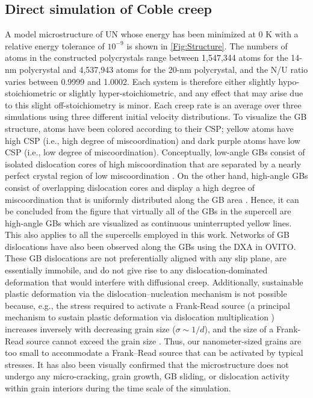 \documentclass[preprint,12pt,sort&compress]{elsarticle} %
\newcommand{\?}{\stackrel{?}{=}}
\begin{document}
\subsection{Direct simulation of Coble creep}
\label{Sec:CreepResults}

A model microstructure of UN whose energy has been minimized at 0 K with a relative energy tolerance of $10^{-9}$ is shown in \cref{Fig:Structure}. The numbers of atoms in the constructed polycrystals range between 1,547,344 atoms for the 14-nm polycrystal and 4,537,943 atoms for the 20-nm polycrystal, and the N/U ratio varies between 0.9999 and 1.0002. Each system is therefore either slightly hypo-stoichiometric or slightly hyper-stoichiometric, and any effect that may arise due to this slight off-stoichiometry is minor. Each creep rate is an average over three simulations using three different initial velocity distributions. To visualize the GB structure, atoms have been colored according to their CSP; yellow atoms have high CSP (i.e., high degree of miscoordination) and dark purple atoms have low CSP (i.e., low degree of miscoordination). Conceptually, low-angle GBs consist of isolated dislocation cores of high miscoordination that are separated by a nearly perfect crystal region of low miscoordination \cite{Keblinski1999}. On the other hand, high-angle GBs consist of overlapping dislocation cores and display a high degree of miscoordination that is uniformly distributed along the GB area \cite{Haslam2004}. Hence, it can be concluded from the figure that virtually all of the GBs in the supercell are high-angle GBs which are visualized as continuous uninterrupted yellow lines. This also applies to all the supercells employed in this work. Networks of GB dislocations have also been observed along the GBs using the DXA in OVITO. These GB dislocations are not preferentially aligned with any slip plane, are essentially immobile, and do not give rise to any dislocation-dominated deformation that would interfere with diffusional creep. Additionally, sustainable plastic deformation via the dislocation–nucleation mechanism is not possible because, e.g., the stress required to activate a Frank-Read source (a principal mechanism to sustain plastic deformation via dislocation multiplication \cite{Murty2013}) increases inversely with decreasing grain size ($\sigma \sim 1/d$), and the size of a Frank-Read source cannot exceed the grain size \cite{Yamakov2001, Yamakov2002}. Thus, our nanometer-sized grains are too small to accommodate a Frank–Read source that can be activated by typical stresses. It has also been visually confirmed that the microstructure does not undergo any micro-cracking, grain growth, GB sliding, or dislocation activity within grain interiors during the time scale of the simulation.
\end{document}
